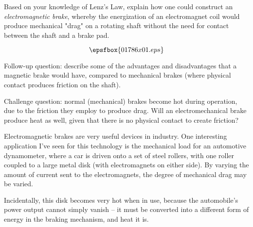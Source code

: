 

Based on your knowledge of Lenz's Law, explain how one could construct an {\it electromagnetic brake}, whereby the energization of an electromagnet coil would produce mechanical "drag" on a rotating shaft without the need for contact between the shaft and a brake pad.







$$\epsfbox{01786x01.eps}$$

Follow-up question: describe some of the advantages and disadvantages that a magnetic brake would have, compared to mechanical brakes (where physical contact produces friction on the shaft).

\vskip 10pt

Challenge question: normal (mechanical) brakes become hot during operation, due to the friction they employ to produce drag.  Will an electromechanical brake produce heat as well, given that there is no physical contact to create friction?







Electromagnetic brakes are very useful devices in industry.  One interesting application I've seen for this technology is the mechanical load for an automotive dynamometer, where a car is driven onto a set of steel rollers, with one roller coupled to a large metal disk (with electromagnets on either side).  By varying the amount of current sent to the electromagnets, the degree of mechanical drag may be varied.

Incidentally, this disk becomes very hot when in use, because the automobile's power output cannot simply vanish -- it must be converted into a different form of energy in the braking mechanism, and heat it is.




